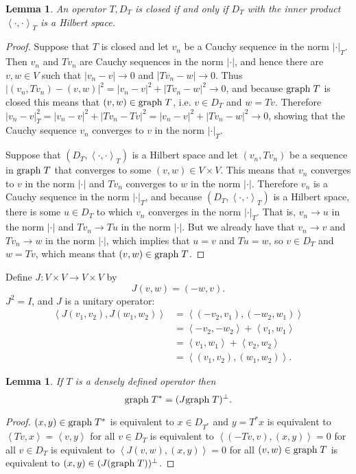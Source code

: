 \documentclass{article}
\newcommand{\inner}[2]{\left\langle #1, #2 \right\rangle}
\newcommand{\graph}{\ensuremath\mathrm{graph}\;}
\newtheorem{lemma}[theorem]{Lemma}
\theoremstyle{definition}
\begin{document}
\begin{lemma}
An operator $T,D_T$ is closed if and only if $D_T$ with the inner product $\inner{\cdot}{\cdot}_T$ is a Hilbert space.
\label{graphIP}
\end{lemma}
\begin{proof}
Suppose that $T$ is closed and let 
 $v_n$ be a Cauchy sequence in the norm $|\cdot|_T$.
Then $v_n$ and $Tv_n$ are Cauchy sequences in the norm $|\cdot|$, and hence
there are $v,w \in V$ such that $|v_n -v| \to 0$ and $|Tv_n - w| \to 0$. 
Thus $|(v_n,Tv_n) - (v,w)|^2 = |v_n-v|^2 + |Tv_n - w|^2 \to 0$, and because $\graph T$ is closed this means that
$(v,w) \in \graph T$, i.e. $v \in D_T$ and $w=Tv$.
Therefore $|v_n-v|_T^2 = |v_n-v|^2 + |Tv_n - Tv|^2 = |v_n-v|^2 + |Tv_n-w|^2 \to 0$, showing that the Cauchy
sequence $v_n$ converges to $v$ in the norm $|\cdot|_T$. 

Suppose that $(D_T,\inner{\cdot}{\cdot}_T)$ is a Hilbert space and let 
$(v_n,Tv_n)$ be a sequence in $\graph T$ that converges to some $(v,w) \in V \times V$. This means
that $v_n$ converges to $v$ in the norm $|\cdot|$ and $Tv_n$ converges to $w$ in the norm $|\cdot|$.
Therefore
$v_n$ is a Cauchy sequence in the norm $|\cdot|_T$, and because $(D_T,\inner{\cdot}{\cdot}_T)$ is  a Hilbert
space, there is some $u \in D_T$ to which $v_n$ converges in the norm $|\cdot|_T$.
That is, $v_n \to u$ in the norm $|\cdot|$ and 
$Tv_n \to Tu$ in the norm $|\cdot|$.
But we already have that $v_n \to v$ and $Tv_n \to w$ in the norm $|\cdot|$, which implies that
$u=v$ and $Tu=w$, so $v \in D_T$ and $w=Tv$, which means that
$(v,w) \in \graph T$. 
\end{proof}




Define $J:V \times V \to V \times V$ by
\[
J(v,w) = (-w,v).
\]
$J^2=I$, and $J$ is a unitary operator:
\begin{align*}
\inner{J(v_1,v_2)}{J(w_1,w_2)}
&=\inner{(-v_2,v_1)}{(-w_2,w_1)}\\
&=\inner{-v_2}{-w_2}+\inner{v_1}{w_1}\\
&=\inner{v_1}{w_1}+\inner{v_2}{w_2}\\
&=\inner{(v_1,v_2)}{(w_1,w_2)}.
\end{align*}

\begin{lemma}
If $T$ is a densely defined  operator then 
\[
\graph T^* = (J \graph T)^\perp.
\]
\label{adjointgraph}
\end{lemma}
\begin{proof}
$(x,y) \in \graph T^*$ is equivalent to $x \in D_{T^*}$ and $y=T^*x$ is equivalent to
$\inner{Tv}{x} = \inner{v}{y}$ for all $v \in D_T$  is equivalent to
$\inner{(-Tv,v)}{(x,y)}=0$ for all $v \in D_T$ is equivalent to
$\inner{J(v,w)}{(x,y)}=0$ for all $(v,w) \in \graph T$ is equivalent to 
$(x,y) \in (J(\graph T))^\perp$.
\end{proof}
\end{document}
